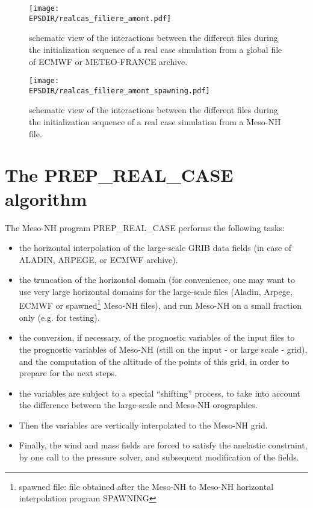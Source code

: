 \begin{figure}[!ht]
\centerline{\texttt{[image: \\EPSDIR/realcas\_filiere\_amont.pdf]}}
\caption{schematic view of the interactions between the different files
during the initialization sequence of a real case simulation from a global file
of ECMWF or METEO-FRANCE archive.
\label{schematicsequence}}
\end{figure}

\begin{figure}[!ht]
\centerline{\texttt{[image: \\EPSDIR/realcas\_filiere\_amont\_spawning.pdf]}}
\caption{schematic view of the interactions between the different files
during the initialization sequence of a real case simulation from a Meso-NH file.
\label{schematicsequence2}}
\end{figure}


\clearpage

\section{The PREP\_REAL\_CASE algorithm}

The Meso-NH program PREP\_REAL\_CASE performs the following tasks:
\begin{itemize}
\item the horizontal interpolation of the large-scale GRIB data fields
(in case of ALADIN, ARPEGE, or ECMWF archive).
\item the truncation of the horizontal domain (for convenience, one may want
to use very large horizontal domains for the large-scale files
(Aladin, Arpege, ECMWF or spawned\footnote{spawned file: file obtained after the
Meso-NH to Meso-NH horizontal interpolation program SPAWNING} Meso-NH files),
and run Meso-NH on a small fraction only (e.g. for testing).
\item the conversion, if necessary, of the prognostic variables of the input files to the
prognostic variables of Meso-NH (still on the input - or large scale - grid), and the
computation of the altitude of the points of this grid, in order to
prepare for the next steps.
\item the variables are subject to a special ``shifting'' process,
to take into account the difference between the large-scale and Meso-NH orographies.
\item Then the variables are vertically interpolated to the Meso-NH grid.
\item Finally, the wind and mass fields are forced to satisfy the
anelastic constraint, by one call to the pressure solver, and subsequent
modification of the fields.
\end{itemize}

